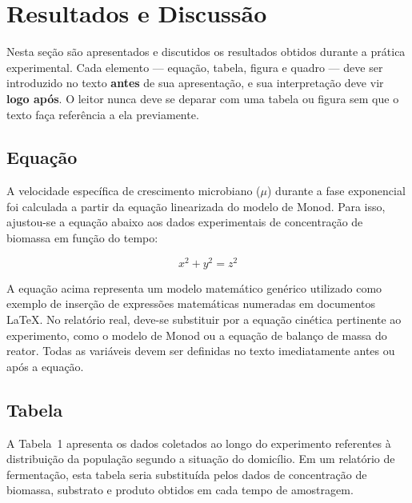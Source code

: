 
\section{Resultados e Discussão}

Nesta seção são apresentados e discutidos os resultados obtidos durante a prática experimental. Cada elemento — equação, tabela, figura e quadro — deve ser introduzido no texto \textbf{antes} de sua apresentação, e sua interpretação deve vir \textbf{logo após}. O leitor nunca deve se deparar com uma tabela ou figura sem que o texto faça referência a ela previamente.

\subsection{Equação}

A velocidade específica de crescimento microbiano ($\mu$) durante a fase exponencial foi calculada a partir da equação linearizada do modelo de Monod. Para isso, ajustou-se a equação abaixo aos dados experimentais de concentração de biomassa em função do tempo:

\begin{equation}
    x^2 + y^2 = z^2
\end{equation}

A equação acima representa um modelo matemático genérico utilizado como exemplo de inserção de expressões matemáticas numeradas em documentos LaTeX. No relatório real, deve-se substituir por a equação cinética pertinente ao experimento, como o modelo de Monod ou a equação de balanço de massa do reator. Todas as variáveis devem ser definidas no texto imediatamente antes ou após a equação.

\subsection{Tabela}

A Tabela~1 apresenta os dados coletados ao longo do experimento referentes à distribuição da população segundo a situação do domicílio. Em um relatório de fermentação, esta tabela seria substituída pelos dados de concentração de biomassa, substrato e produto obtidos em cada tempo de amostragem.

